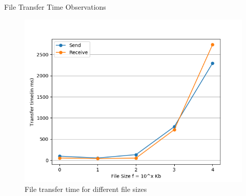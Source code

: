 \documentclass{beamer}
\begin{document}
\begin{frame}{File Transfer Time Observations}
\begin{figure}[h]   
    \includegraphics[scale=0.5]{fileTransfer_5Readings}
    \caption{File transfer time for different file sizes}
    \label{fig:diagram2}
\end{figure}
\end{frame}
\end{document}
